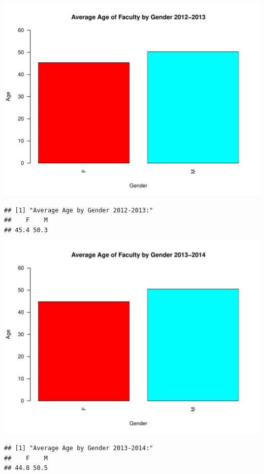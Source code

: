 \documentclass[12pt,a4paper]{article}\usepackage[]{graphicx}\usepackage[]{color}
\makeatletter
\def\maxwidth{ %
  \ifdim\Gin@nat@width>\linewidth
    \linewidth
  \else
    \Gin@nat@width
  \fi
}
\newenvironment{kframe}{%
 \def\at@end@of@kframe{}%
 \ifinner\ifhmode%
  \def\at@end@of@kframe{\end{minipage}}%
  \begin{minipage}{\columnwidth}%
 \fi\fi%
 \def\FrameCommand##1{\hskip\@totalleftmargin \hskip-\fboxsep
 \colorbox{shadecolor}{##1}\hskip-\fboxsep
     \hskip-\linewidth \hskip-\@totalleftmargin \hskip\columnwidth}%
 \MakeFramed {\advance\hsize-\width
   \@totalleftmargin\z@ \linewidth\hsize
   \@setminipage}}%
 {\par\unskip\endMakeFramed%
 \at@end@of@kframe}
\newenvironment{knitrout}{}{} %
\theoremstyle{definition}
\makeatother
\begin{document}
\begin{knitrout}
\includegraphics[width=\maxwidth]{figure/unnamed-chunk-11-9} 
\begin{kframe}\begin{verbatim}
## [1] "Average Age by Gender 2012-2013:"
##    F    M 
## 45.4 50.3
\end{verbatim}
\end{kframe}
\includegraphics[width=\maxwidth]{figure/unnamed-chunk-11-10} 
\begin{kframe}\begin{verbatim}
## [1] "Average Age by Gender 2013-2014:"
##    F    M 
## 44.8 50.5
\end{verbatim}
\end{kframe}
\end{knitrout}
\end{document}
